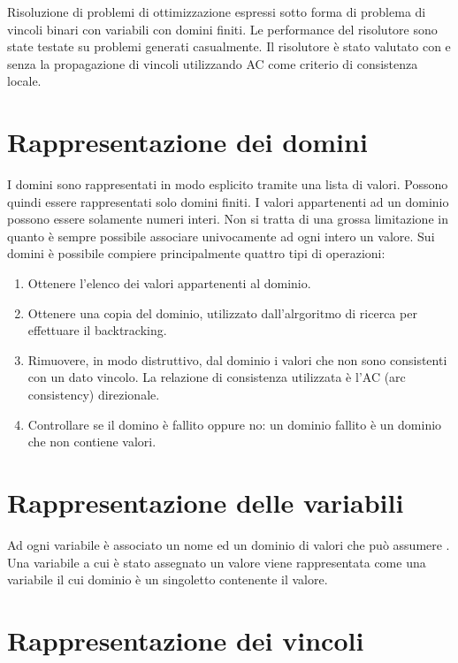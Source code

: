 \documentclass[a4paper,12pt,italian]{article}
\begin{document}
Risoluzione di problemi di ottimizzazione espressi sotto forma di
problema di vincoli binari con variabili con domini finiti. Le
performance del risolutore sono state testate su problemi generati
casualmente. Il risolutore \`e stato valutato con e senza la
propagazione di vincoli utilizzando AC come criterio di consistenza
locale.

\section{Rappresentazione dei domini}

I domini sono rappresentati in modo esplicito tramite una lista di
valori. Possono quindi essere rappresentati solo domini finiti. I
valori appartenenti ad un dominio possono essere solamente numeri
interi. Non si tratta di una grossa limitazione in quanto \`e sempre
possibile associare univocamente ad ogni intero un valore. Sui domini
\`e possibile compiere principalmente quattro tipi di operazioni:

\begin{enumerate}
\item Ottenere l'elenco dei valori appartenenti al dominio.
\item Ottenere una copia del dominio, utilizzato dall'alrgoritmo di
  ricerca per effettuare il backtracking.
\item Rimuovere, in modo distruttivo, dal dominio i valori che non
  sono consistenti con un dato vincolo. La relazione di consistenza
  utilizzata \`e l'AC (arc consistency) direzionale.
\item Controllare se il domino \`e fallito oppure no: un dominio
  fallito \`e un dominio che non contiene valori.
\end{enumerate}

\section{Rappresentazione delle variabili}

Ad ogni variabile \`e associato un nome ed un dominio di valori che
pu\`o assumere . Una variabile a cui \`e stato assegnato un valore
viene rappresentata come una variabile il cui dominio \`e un
singoletto contenente il valore.

\section{Rappresentazione dei vincoli}
\end{document}
